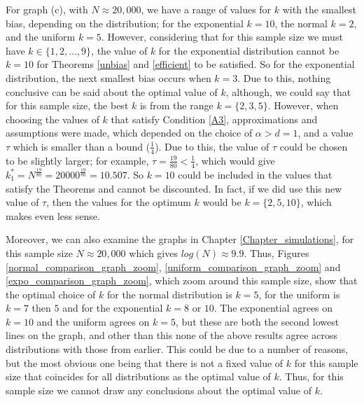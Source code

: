 \documentclass[12pt]{report}
\begin{document}
For graph (c), with $N \approx 20,000$, we have a range of values for $k$ with the smallest bias, depending on the distribution; for the exponential $k=10$, the normal $k=2$, and the uniform $k=5$. However, considering that for this sample size we must have $k \in \{1, 2, ..., 9\}$, the value of $k$ for the exponential distribution cannot be $k=10$ for Theorems \ref{unbias} and \ref{efficient} to be satisfied. So for the exponential distribution, the next smallest bias occurs when $k=3$. Due to this, nothing conclusive can be said about the optimal value of $k$, although, we could say that for this sample size, the best $k$ is from the range $k = \{2, 3, 5\}$. However, when choosing the values of $k$ that satisfy Condition \ref{A3}, approximations and assumptions were made, which depended on the choice of $\alpha > d = 1$, and a value $\tau$ which is smaller than a bound ($\frac{1}{4}$). Due to this, the value of $\tau$ could be chosen to be slightly larger; for example, $\tau = \frac{19}{80} < \frac{1}{4}$, which would give $k_{1}^{*} = N^{\frac{19}{80}} = 20000^{\frac{19}{80}} = 10.507$. So $k=10$ could be included in the values that satisfy the Theorems and cannot be discounted. In fact, if we did use this new value of $\tau$, then the values for the optimum $k$ would be $k = \{2, 5, 10\}$, which makes even less sense.


Moreover, we can also examine the graphs in Chapter \ref{Chapter_simulations}, for this sample size $N \approx 20,000$ which gives $log(N) \approx 9.9$. Thus, Figures \ref{normal_comparison_graph_zoom}, \ref{uniform_comparison_graph_zoom} and \ref{expo_comparison_graph_zoom}, which zoom around this sample size, show that the optimal choice of $k$ for the normal distribution is $k=5$, for the uniform is $k=7$ then $5$ and for the exponential $k=8$ or $10$. The exponential agrees on $k=10$ and the uniform agrees on $k=5$, but these are both the second lowest lines on the graph, and other than this none of the above results agree across distributions with those from earlier. This could be due to a number of reasons, but the most obvious one being that there is not a fixed value of $k$ for this sample size that coincides for all distributions as the optimal value of $k$. Thus, for this sample size we cannot draw any conclusions about the optimal value of $k$.
\end{document}
